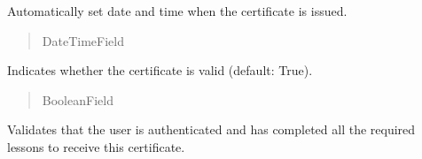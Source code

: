 \documentclass[letterpaper,10pt,english]{sphinxmanual}
\begin{document}
\begin{fulllineitems}
\begin{fulllineitems}
\end{fulllineitems}


\begin{fulllineitems}
\label{\detokenize{certificates:certificates.models.Certificate.issued_at}}
\pysigstartsignatures
\pysigline
{}
\pysigstopsignatures
\sphinxAtStartPar
Automatically set date and time when the certificate is issued.
\begin{quote}\begin{description}
\sphinxAtStartPar
DateTimeField

\end{description}\end{quote}

\end{fulllineitems}


\begin{fulllineitems}
\label{\detokenize{certificates:certificates.models.Certificate.is_valid}}
\pysigstartsignatures
\pysigline
{}
\pysigstopsignatures
\sphinxAtStartPar
Indicates whether the certificate is valid (default: True).
\begin{quote}\begin{description}
\sphinxAtStartPar
BooleanField

\end{description}\end{quote}

\end{fulllineitems}


\begin{fulllineitems}
\label{\detokenize{certificates:certificates.models.Certificate.clean}}
\pysigstartsignatures
\pysiglinewithargsret
{}
{}
{}
\pysigstopsignatures
\sphinxAtStartPar
Validates that the user is authenticated and has completed all
the required lessons to receive this certificate.


\end{fulllineitems}
\end{fulllineitems}
\end{document}
